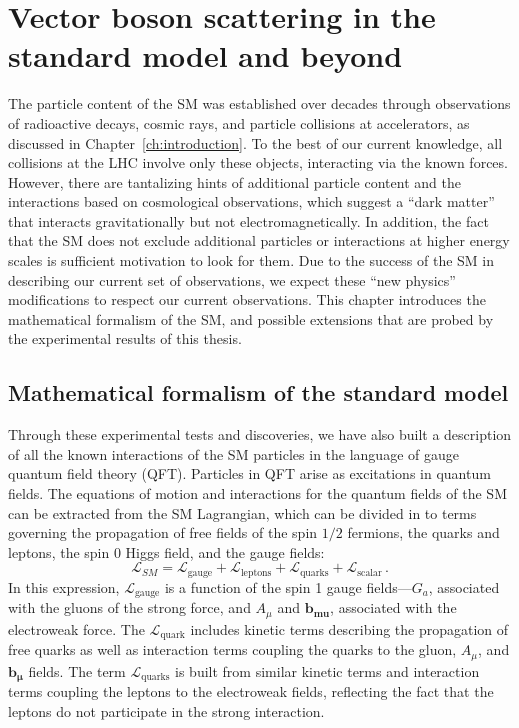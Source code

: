 \chapter{Vector boson scattering in the standard model and beyond}
\label{ch:phenomenology}
The particle content of the SM was established over decades through
observations of radioactive decays, cosmic rays, and particle
collisions at accelerators, as discussed in Chapter~\ref{ch:introduction}. 
To the best of our
current knowledge, all collisions at the LHC involve only these objects,
interacting via the known forces.
However, there are tantalizing hints of additional particle content and the 
interactions based on cosmological observations, which suggest a ``dark matter''
that interacts gravitationally but not electromagnetically. In addition, 
the fact that the SM does not exclude additional particles or interactions at
higher energy scales is sufficient motivation to look for them. Due to the success
of the SM in describing our current set of observations, we expect these
``new physics'' modifications to respect our current observations.
This chapter introduces the mathematical formalism of the SM, and possible
extensions that are probed by the experimental results of this thesis.

\section{Mathematical formalism of the standard model}

Through these experimental tests and
discoveries, we have also built a description of all the known interactions 
of the SM particles in the language of gauge quantum field theory (QFT).
Particles in QFT arise as excitations in quantum fields.
The equations of motion and interactions for the quantum fields of the SM can
be extracted from the SM Lagrangian, which can be divided in to 
terms governing the propagation of free fields of the spin $1/2$ fermions,
the quarks and leptons, the spin 0 Higgs field, and the gauge fields:
\begin{equation}
  \mathcal{L}_{SM} = \mathcal{L}_{\text{gauge}} + \mathcal{L}_{\text{leptons}} + 
      \mathcal{L}_{\text{quarks}} + \mathcal{L}_{\text{scalar}} \,.
  \label{eq:smlagrangian}
\end{equation}
In this expression, $\mathcal{L}_{\text{gauge}}$ is a function of the 
spin 1 gauge fields---$G_a$, associated with the gluons of the strong
force, and $A_\mu$ and $\mathbf{b_{mu}}$, associated with the electroweak force.
The $\mathcal{L}_{\text{quark}}$ includes kinetic terms describing the 
propagation of free quarks as well as interaction terms coupling the quarks
to the gluon, $A_\mu$, and $\mathbf{b_\mu}$ fields. 
The term $\mathcal{L}_{\text{quarks}}$ is built from similar kinetic terms and 
interaction terms coupling the leptons to the electroweak fields, reflecting
the fact that the leptons do not participate in the strong interaction.

